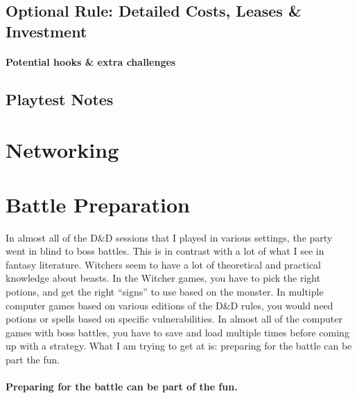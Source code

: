 \documentclass[twocolumn]{dndbook}
\begin{document}
\subsection{Optional Rule: Detailed Costs, Leases \& Investment}


\paragraph*{Potential hooks \& extra challenges}


\subsection{Playtest Notes}

\section{Networking}


\section{Battle Preparation}
\label{sec:battle_preparation}

In almost all of the D\&D sessions that I played in various settings, the party went in blind to boss battles.
This is in contrast with a lot of what I see in fantasy literature.
Witchers seem to have a lot of theoretical and practical knowledge about beasts.
In the Witcher games, you have to pick the right potions, and get the right ``signs'' to use based on the monster.
In multiple computer games based on various editions of the D\&D rules, you would need potions or spells based on specific vulnerabilities.
In almost all of the computer games with boss battles, you have to save and load multiple times before coming up with a strategy.
What I am trying to get at is: preparing for the battle can be part the fun.\par

\begin{emphasisParagraph}
	\paragraph*{Preparing for the battle can be part of the fun.}
\end{emphasisParagraph}
\end{document}
